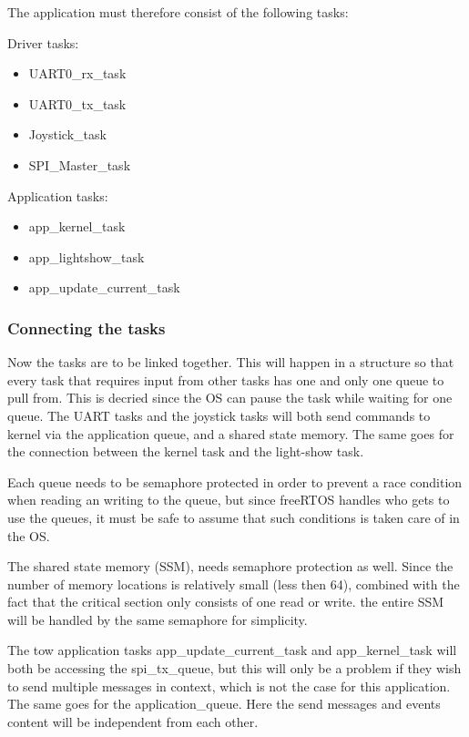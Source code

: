 The application must therefore consist of the following tasks:

Driver tasks:
\begin{itemize}[noitemsep]
	\item UART0\_rx\_task
	\item UART0\_tx\_task
	\item Joystick\_task
	\item SPI\_Master\_task
\end{itemize}

Application tasks:
\begin{itemize}[noitemsep]
	\item app\_kernel\_task
	\item app\_lightshow\_task
	\item app\_update\_current\_task
\end{itemize}	
	
\subsubsection{Connecting the tasks}
Now the tasks are to be linked together. This will happen in a structure so that every task that requires input from other tasks has one and only one queue to pull from. This is decried since the OS can pause the task while waiting for one queue. The UART tasks and the joystick tasks will both send commands to kernel via the application queue, and a shared state memory. The same goes for the connection between the kernel task and the light-show task. 

Each queue needs to be semaphore protected in order to prevent a race condition when reading an writing to the queue, but since freeRTOS handles who gets to use the queues, it must be safe to assume that such conditions is taken care of in the OS. 

The shared state memory (SSM), needs semaphore protection as well. Since the number of memory locations is relatively small (less then 64), combined with the fact that the critical section only consists of one read or write. the entire SSM will be handled by the same semaphore for simplicity. 

The tow application tasks app\_update\_current\_task and app\_kernel\_task will both be accessing the spi\_tx\_queue, but this will only be a problem if they wish to send multiple messages in context, which is not the case for this application. The same goes for the application\_queue. Here the send messages and events content will be independent from each other.  


